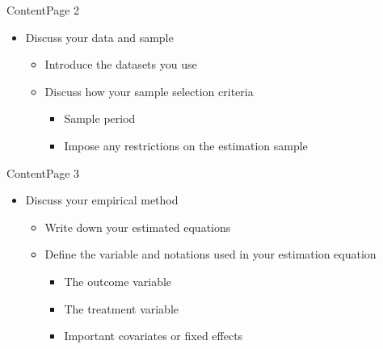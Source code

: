 \documentclass[dvipsnames,hyperref={pdfpagelabels=false}]{beamer}
\begin{document}
\begin{frame}{Content}{Page 2}
	\begin{itemize} 
		\item Discuss your data and sample
		\vspace{0.2cm}
		\begin{itemize}
			\item Introduce the datasets you use
			\vspace{0.2cm} 
			\item Discuss how your sample selection criteria
			\vspace{0.2cm} 	
			\begin{itemize}
				\item Sample period
				\vspace{0.2cm}
				\item Impose any restrictions on the estimation sample
			\end{itemize}
		\end{itemize}
	\end{itemize}
\end{frame}




\begin{frame}{Content}{Page 3}
	\begin{itemize} 
		\item Discuss your empirical method
		\vspace{0.2cm}
		\begin{itemize}
			\item Write down your estimated equations
			\vspace{0.2cm} 
			\item Define the variable and notations used in your estimation equation
			\vspace{0.2cm} 	
			\begin{itemize}
				\item The outcome variable
				\vspace{0.2cm}
				\item The treatment variable
				\vspace{0.2cm} 
				\item Important covariates or fixed effects
			\end{itemize}
		\end{itemize}
	\end{itemize}
\end{frame}
\end{document}
